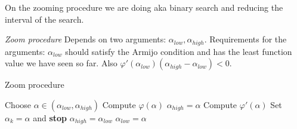 On the zooming procedure we are doing aka binary search and reducing the interval of the search.

\begin{definition} \textit{Zoom procedure}
Depends on two arguments: $\alpha_{low}, \alpha_{high}$. Requirements for the arguments: $\alpha_{low}$ should satisfy the Armijo condition and has the least function value we have seen so far. Also $\varphi'(\alpha_{low})(\alpha_{high} - \alpha_{low}) < 0$.
\begin{algorithm}[H]
  \caption{Zoom procedure}
  \begin{algorithmic}[1]
      \State Choose $\alpha \in (\alpha_{low}, \alpha_{high})$
      \State Compute $\varphi(\alpha)$
          \State $\alpha_{high} = \alpha$
      \EndIf
      \State Compute $\varphi'(\alpha)$
          \State Set $\alpha_k = \alpha$ and \textbf{stop}
      \EndIf
          \State $\alpha_{high} = \alpha_{low}$
      \EndIf
      \State $\alpha_{low} = \alpha$
  \EndWhile
\end{algorithmic}
\end{algorithm}
\end{definition}

\newpage